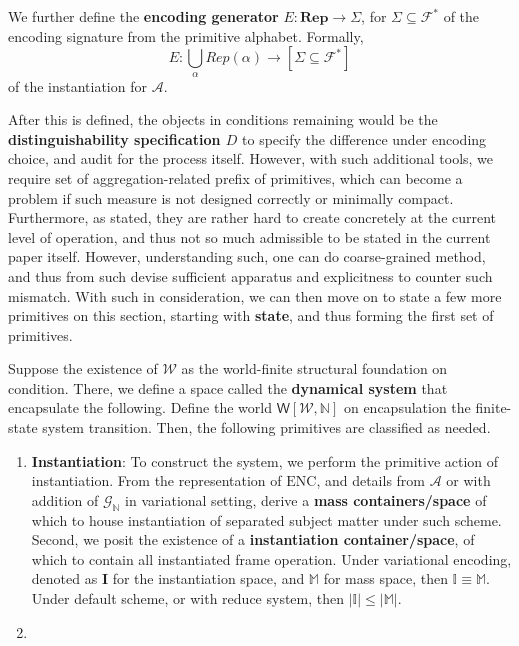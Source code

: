 \begin{definition}
	We further define the \textbf{encoding generator} $E:\mathbf{Rep}\to \Sigma$, for $\Sigma\subseteq \mathcal{F}^{*}$ of the encoding signature from the primitive alphabet. Formally,
	\begin{equation}
		E: \bigcup_{\alpha}Rep(\alpha)\to [\Sigma \subseteq \mathcal{F}^{*}] 
	\end{equation} 
	of the instantiation for $\mathcal{A}$. 
\end{definition}
After this is defined, the objects in conditions remaining would be the \textbf{distinguishability specification $D$} to specify the difference under encoding choice, and audit for the process itself. However, with such additional tools, we require set of aggregation-related prefix of primitives, which can become a problem if such measure is not designed correctly or minimally compact. Furthermore, as stated, they are rather hard to create concretely at the current level of operation, and thus not so much admissible to be stated in the current paper itself. However, understanding such, one can do coarse-grained method, and thus from such devise sufficient apparatus and explicitness to counter such mismatch.
With such in consideration, we can then move on to state a few more primitives on this section, starting with \textbf{state}, and thus forming the first set of primitives. 
\begin{definition}
	Suppose the existence of $\mathcal{W}$ as the world-finite structural foundation on condition. There, we define a space called the \textbf{dynamical system} that encapsulate the following. Define the world $\mathsf{W}[\mathcal{W},\mathbb{N}]$ on encapsulation the finite-state system transition. Then, the following primitives are classified as needed. 
	{\small
		\begin{enumerate}[itemsep=1pt,topsep=1pt]
			\item \textbf{Instantiation}: To construct the system, we perform the primitive action of instantiation. From the representation of $\mathrm{ENC}$, and details from $\mathcal{A}$ or with addition of $\mathcal{G}_{\mathbb{N}}$ in variational setting, derive a \textbf{mass containers/space} of which to house instantiation of separated subject matter under such scheme. Second, we posit the existence of a \textbf{instantiation container/space}, of which to contain all instantiated frame operation. Under variational encoding, denoted as $\mathbf{I}$ for the instantiation space, and $\mathbb{M}$ for mass space, then $\mathbb{I}\equiv \mathbb{M}$. Under default scheme, or with reduce system, then $|\mathbb{I}|\leq |\mathbb{M}|$. 
			\item \textbf{}
		\end{enumerate}
	}
\end{definition}


